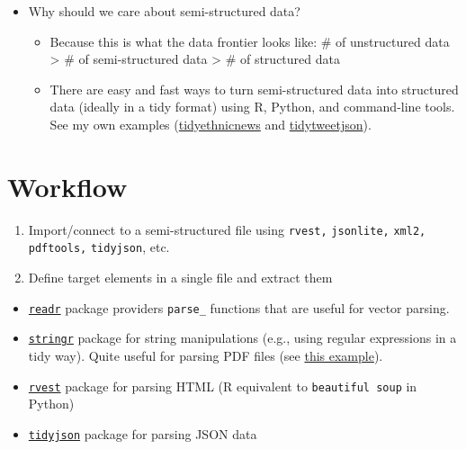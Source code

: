 \documentclass[
]{book}
\providecommand{\tightlist}{%
  \setlength{\itemsep}{0pt}\setlength{\parskip}{0pt}}
\begin{document}
\begin{itemize}
\item
  Why should we care about semi-structured data?

  \begin{itemize}
  \tightlist
  \item
    Because this is what the data frontier looks like: \# of unstructured data \textgreater{} \# of semi-structured data \textgreater{} \# of structured data
  \item
    There are easy and fast ways to turn semi-structured data into structured data (ideally in a tidy format) using R, Python, and command-line tools. See my own examples (\href{https://github.com/jaeyk/tidyethnicnews}{tidyethnicnews} and \href{https://github.com/jaeyk/tidytweetjson}{tidytweetjson}).
  \end{itemize}
\end{itemize}

\section{Workflow}\label{workflow-2}

\begin{enumerate}
\def\labelenumi{\arabic{enumi}.}
\item
  Import/connect to a semi-structured file using \texttt{rvest,} \texttt{jsonlite,} \texttt{xml2,} \texttt{pdftools,} \texttt{tidyjson}, etc.
\item
  Define target elements in a single file and extract them
\end{enumerate}

\begin{itemize}
\item
  \href{https://readr.tidyverse.org/}{\texttt{readr}} package providers \texttt{parse\_} functions that are useful for vector parsing.
\item
  \href{https://stringr.tidyverse.org/}{\texttt{stringr}} package for string manipulations (e.g., using regular expressions in a tidy way). Quite useful for parsing PDF files (see \href{https://themockup.blog/posts/2020-04-03-beer-and-pdftools-a-vignette/}{this example}).
\item
  \href{https://github.com/tidyverse/rvest}{\texttt{rvest}} package for parsing HTML (R equivalent to \texttt{beautiful\ soup} in Python)
\item
  \href{https://github.com/sailthru/tidyjson}{\texttt{tidyjson}} package for parsing JSON data
\end{itemize}
\end{document}
